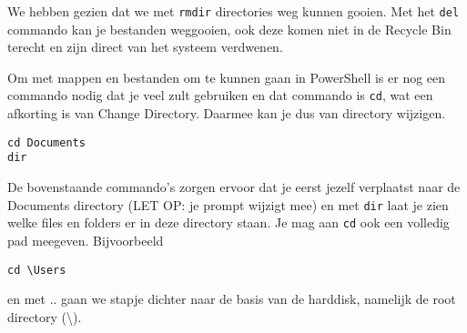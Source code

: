 We hebben gezien dat we met \texttt{rmdir} directories weg kunnen gooien. Met het \texttt{del} commando kan je bestanden weggooien, ook deze komen niet in de Recycle Bin terecht en zijn direct van het systeem verdwenen.

Om met mappen en bestanden om te kunnen gaan in PowerShell is er nog een commando nodig dat je veel zult gebruiken en dat commando is \texttt{cd}, wat een afkorting is van Change Directory. Daarmee kan je dus van directory wijzigen.

\begin{lstlisting}[style=DOS]
cd Documents
dir
\end{lstlisting}
De bovenstaande commando's zorgen ervoor dat je eerst jezelf verplaatst naar de Documents directory (LET OP: je prompt wijzigt mee) en met \texttt{dir} laat je zien welke files en folders er in deze directory staan. Je mag aan \texttt{cd} ook een volledig pad meegeven. Bijvoorbeeld
\begin{lstlisting}[style=DOS]
cd \Users
\end{lstlisting}
en met .. gaan we stapje dichter naar de basis van de harddisk, namelijk de root directory (\textbackslash).

